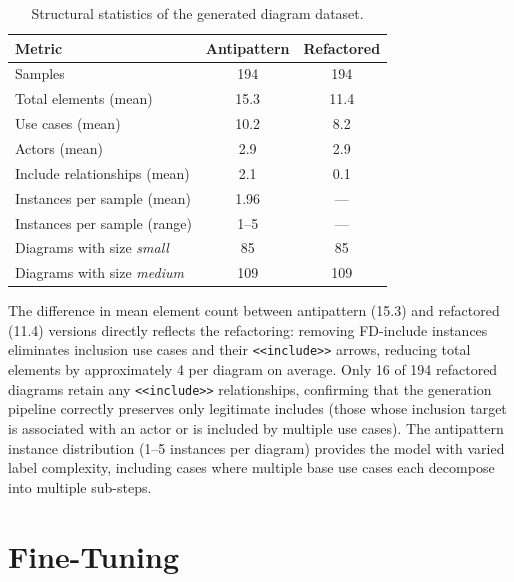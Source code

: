 \documentclass[12pt, a4paper]{article}
\begin{document}
\begin{table}[h]
\centering
\caption{Structural statistics of the generated diagram dataset.}
\label{tab:stats}
\begin{tabular}{lcc}
\toprule
\textbf{Metric} & \textbf{Antipattern} & \textbf{Refactored} \\
\midrule
Samples                           & 194   & 194   \\
\midrule
Total elements (mean)           & 15.3  & 11.4  \\
Use cases (mean)                  & 10.2  & 8.2   \\
Actors (mean)                     & 2.9   & 2.9   \\
Include relationships (mean)      & 2.1   & 0.1   \\
\midrule
Instances per sample (mean)       & 1.96  & —     \\
Instances per sample (range)      & 1–5   & —     \\
\midrule
Diagrams with size \emph{small}   & 85    & 85    \\
Diagrams with size \emph{medium}  & 109   & 109   \\
\bottomrule
\end{tabular}
\end{table}

The difference in mean element count between antipattern (15.3) and
refactored (11.4) versions directly reflects the refactoring: removing
FD-include instances eliminates inclusion use cases and their
\texttt{<<include>>} arrows, reducing total elements by approximately 4 per
diagram on average.  Only 16 of 194 refactored diagrams retain any
\texttt{<<include>>} relationships, confirming that the generation pipeline
correctly preserves only legitimate includes (those whose inclusion
target is associated with an actor or is included by multiple use cases).
The antipattern instance distribution (1--5 instances per diagram) provides
the model with varied label complexity, including cases
where multiple base use cases each decompose into multiple sub-steps.

\section{Fine-Tuning}
\label{sec:finetuning}
\end{document}
